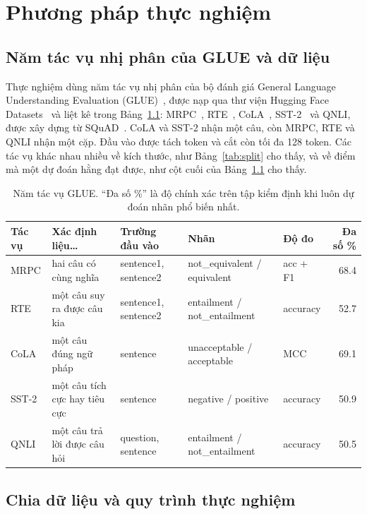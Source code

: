 \chapter{Phương pháp thực nghiệm}
\label{ch:method}

\section{Năm tác vụ nhị phân của GLUE và dữ liệu}

Thực nghiệm dùng năm tác vụ nhị phân của bộ đánh giá General Language Understanding Evaluation (GLUE)~\cite{wang2019glue}, được nạp qua thư viện Hugging Face Datasets~\cite{lhoest2021datasets} và liệt kê trong Bảng~\ref{tab:data}: MRPC~\cite{dolan2005mrpc}, RTE~\cite{dagan2006rte}, CoLA~\cite{warstadt2019cola}, SST-2~\cite{socher2013sst} và QNLI, được xây dựng từ SQuAD~\cite{rajpurkar2016squad}. CoLA và SST-2 nhận một câu, còn MRPC, RTE và QNLI nhận một cặp. Đầu vào được tách token và cắt còn tối đa 128 token. Các tác vụ khác nhau nhiều về kích thước, như Bảng~\ref{tab:split} cho thấy, và về điểm mà một dự đoán hằng đạt được, như cột cuối của Bảng~\ref{tab:data} cho thấy.

\begin{table}[htbp]
  \centering\tablestyle
  \caption{Năm tác vụ GLUE. ``Đa số \%'' là độ chính xác trên tập kiểm định khi luôn dự đoán nhãn phổ biến nhất.}
  \label{tab:data}
  \setlength{\tabcolsep}{3.5pt}\begin{tabularx}{\linewidth}{l X l l l r}
    \toprule
    Tác vụ & Xác định liệu\ldots & Trường đầu vào & Nhãn & Độ đo & Đa số \%\\
    \midrule
    MRPC & hai câu có cùng nghĩa & sentence1, sentence2 & not\_equivalent / equivalent & acc + F1 & 68.4\\
    RTE & một câu suy ra được câu kia & sentence1, sentence2 & entailment / not\_entailment & accuracy & 52.7\\
    CoLA & một câu đúng ngữ pháp & sentence & unacceptable / acceptable & MCC & 69.1\\
    SST-2 & một câu tích cực hay tiêu cực & sentence & negative / positive & accuracy & 50.9\\
    QNLI & một câu trả lời được câu hỏi & question, sentence & entailment / not\_entailment & accuracy & 50.5\\
    \bottomrule
  \end{tabularx}
\end{table}

\section{Chia dữ liệu và quy trình thực nghiệm}
\label{sec:protocol}

